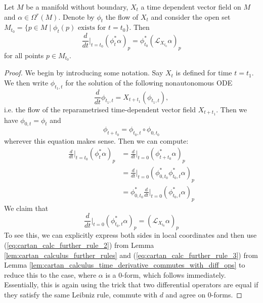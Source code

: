 \begin{proposition}
    \label{prop:lie_derivative_formula}
    Let $M$ be a manifold without boundary, $X_t$ a time dependent vector field on $M$ and $\alpha \in \Omega^r(M).$ Denote by $\phi_t$ the flow of $X_t$ and consider the open set $M_{t_0} = \{p\in M \mid \phi_t(p) \text{ exists for } t=t_0\}$. Then
    \[
        \frac{d}{dt}\bigg|_{t=t_0}(\phi_t^\ast\alpha)_p = \phi_{t_0}^\ast(\mathcal{L}_{X_{t_0}} \alpha)_p
    \]
    for all points $p \in M_{t_0}$.
\end{proposition}
\begin{proof}
    We begin by introducing some notation. Say $X_t$ is defined for time $t = t_1$. We then write $\phi_{t_1,t}$ for the solution of the following  nonautonomous ODE
    \[
    \frac{d}{dt}\phi_{t_1,t} = X_{t+t_1}(\phi_{t_1,t}),
    \]
    i.e. the flow of the reparametrised time-dependent vector field $X_{t+t_1}$. Then we have $\phi_{0,t} = \phi_t$ and 
    \[
    \phi_{t+t_0} = \phi_{t_0,t} \circ \phi_{0,t_0} 
    \]
    wherever this equation makes sense. Then we can compute:
    \begin{align*}
        \frac{d}{dt}\bigg|_{t=t_0}(\phi_t^\ast\alpha)_p &= \frac{d}{dt}\bigg|_{t=0}(\phi_{t+t_0}^\ast\alpha)_p\\ &= \frac{d}{dt}\bigg|_{t=0}(\phi_{0,t_0}^\ast\phi_{t_0,t}^\ast\alpha)_p \\
        &= \phi_{0,t_0}^\ast \frac{d}{dt}\bigg|_{t=0} (\phi_{t_0,t}^\ast\alpha)_p
    \end{align*}
    We claim that
    \[
        \frac{d}{dt}\bigg|_{t=0} (\phi_{t_0,t}^\ast\alpha)_p = (\mathcal{L}_{X_{t_0}}\alpha)_p
    \]
    To see this, we can explicitly express both sides in local coordinates and then use (\ref{eq:cartan_calc_further_rule_2}) from Lemma \ref{lem:cartan_calculus_further_rules} and (\ref{eq:cartan_calc_further_rule_3}) from Lemma \ref{lem:cartan_calculus_time_derivative_commutes_with_diff_ops} to reduce this to the case, where $\alpha$ is a $0$-form, which follows immediately. Essentially, this is again using the trick that two differential operators are equal if they satisfy the same Leibniz rule, commute with $d$ and agree on $0$-forms. 
\end{proof}

